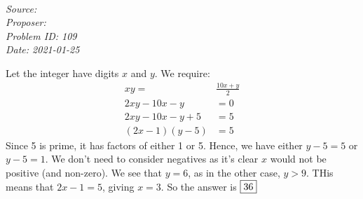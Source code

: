 \SSbreak\\
\emph{Source: \Cfolk}\\
\emph{Proposer: \Pss}\\
\emph{Problem ID: 109}\\
\emph{Date: 2021-01-25}\\
\SSbreak

\bigskip

\begin{solution}\hfil\medskip

  Let the integer have digits \(x\) and \(y\). We require:
  \begin{align*}
    xy=&\frac{10x+y}{2}\\
    2xy-10x-y&=0\\
    2xy-10x-y+5&=5\\
    (2x-1)(y-5)&=5
  \end{align*}
Since 5 is prime, it has factors of either 1 or 5. Hence, we have either \(y-5=5\) or \(y-5=1\). We don't need to consider negatives as it's clear \(x\) would not be positive (and non-zero). We see that \(y=6\), as in the other case, \(y>9\). THis means that \(2x-1=5\), giving \(x=3\). So the answer is \(\fbox{36}\)
\end{solution}\bigskip

